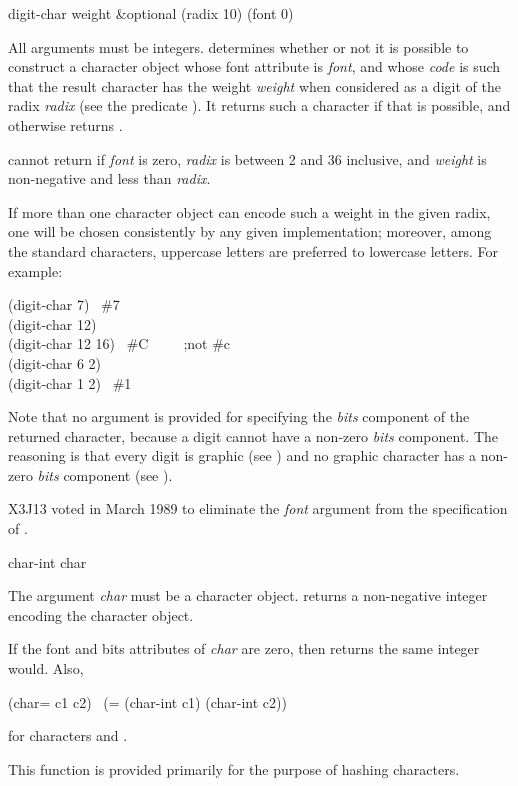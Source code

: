 \begin{defun}[Function]
digit-char weight &optional (radix 10) (font 0)

All arguments must be integers.  
determines whether or not it is possible to construct
a character object
whose font attribute is {\it font}, and whose {\it code} is such that the
result character has the weight {\it weight} when considered as
a digit of the radix {\it radix} (see the predicate ).
It returns such a character if that is possible, and otherwise returns {\false}.

 cannot return {\false} if {\it font} is zero,
{\it radix} is between 2 and 36 inclusive, and {\it weight} is non-negative
and less than {\it radix}.

If more than one character object can encode
such a weight in the given radix, one will be chosen consistently
by any given implementation; moreover, among the standard characters,
uppercase letters are preferred to lowercase letters.
For example:
\begin{lisp}
(digit-char 7) \EV\ \#{\Xbackslash}7 \\
(digit-char 12) \EV\ {\false} \\
(digit-char 12 16) \EV\ \#{\Xbackslash}C~~~~~;{\rm not} \#{\Xbackslash}c \\
(digit-char 6 2) \EV\ {\false} \\
(digit-char 1 2) \EV\ \#{\Xbackslash}1
\end{lisp}
Note that no argument is provided for specifying the {\it bits} component
of the returned character, because a digit cannot have a non-zero
{\it bits} component.  The reasoning is that every digit is graphic
(see ) and no graphic character has a non-zero
{\it bits} component (see ).

\begin{newer}
X3J13 voted in March 1989 
to eliminate the {\it font} argument from the specification of .
\end{newer}
\end{defun}

\begin{defun}[Function]
char-int char

The argument {\it char} must be a character object.
 returns a non-negative integer encoding the character object.

If the font and bits attributes of {\it char} are zero, then
 returns the same integer  would.
Also,
\begin{lisp}
(char= c1 c2) \EQ\ (= (char-int c1) (char-int c2))
\end{lisp}
for characters  and .

This function is provided primarily for the purpose of hashing characters.
\end{defun}


